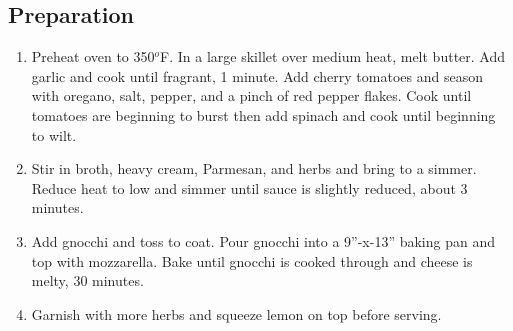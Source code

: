 \subsection{Preparation}
\begin{enumerate}
  \item Preheat oven to 350$^o$F. In a large skillet over medium heat, melt butter. Add garlic and cook until fragrant, 1 minute. Add cherry tomatoes and season with oregano, salt, pepper, and a pinch of red pepper flakes. Cook until tomatoes are beginning to burst then add spinach and cook until beginning to wilt.
  \item Stir in broth, heavy cream, Parmesan, and herbs and bring to a simmer. Reduce heat to low and simmer until sauce is slightly reduced, about 3 minutes. 
  \item Add gnocchi and toss to coat. Pour gnocchi into a 9''-x-13'' baking pan and top with mozzarella. Bake until gnocchi is cooked through and cheese is melty, 30 minutes. 
  \item Garnish with more herbs and squeeze lemon on top before serving.
\end{enumerate}

